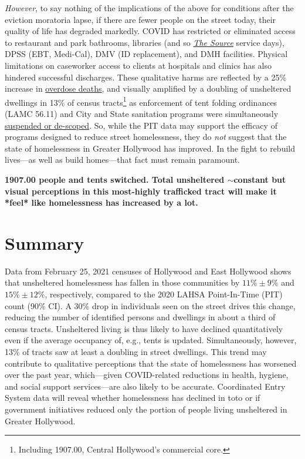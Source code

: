 \documentclass[11pt,twocolumn]{article}
\def\bfr{\bf\color{red}}
\def\resp{respectively}
\begin{document}
{\it However}, to say nothing of the implications of the above for conditions after the eviction moratoria
lapse, if there are fewer people on the street today, their quality of life has degraded markedly. COVID has restricted or 
eliminated access to restaurant and park bathrooms, libraries (and so 
\href{https://www.lapl.org/homeless-resources/the-source}{\it The Source} service days), DPSS 
(EBT, Medi-Cal), DMV (ID replacement), and DMH facilities. Physical limitations on caseworker 
access to clients at hospitals and clinics has also hindered successful discharges. These qualitative harms are reflected 
by a 25\% increase in 
\href{https://www.latimes.com/california/story/2021-01-07/the-powerful-synthetic-opioid-fentanyl-is-behind-rising-deaths-in-the-homeless-population}{overdose deaths}, and visually amplified by a doubling of unsheltered dwellings in 13\% of census 
tracts\footnote{Including 1907.00, Central Hollywood's commercial core.} as enforcement of tent folding ordinances
(LAMC 56.11) and City and State sanitation programs were simultaneously 
\href{https://clkrep.lacity.org/onlinedocs/2020/20-0147_misc_3-17-20_p.pdf}{suspended or de-scoped}. 
So, while the PIT data may support the efficacy of programs designed to reduce street 
homelessness, they do {\it not} suggest that the state of homelessness in Greater Hollywood has improved. In the 
fight to rebuild lives---as well as build homes---that fact must remain paramount.


{\bfr 1907.00 people and tents switched. Total unsheltered $\sim$constant but visual perceptions
in this most-highly trafficked tract will make it *feel* like homelessness has increased by a lot.}



\section{Summary}
\label{sec:summary}

Data from February 25, 2021 censuses of Hollywood and East Hollywood shows that 
unsheltered homelessness has fallen in those communities by $11\%\pm9\%$ and 
$15\%\pm12\%$, \resp, compared to the 2020 LAHSA Point-In-Time (PIT) count (90\% CI). 
A 30\% drop in individuals seen on the street drives this change, reducing the number of identified 
persons and dwellings in about a third of census tracts. Unsheltered living is thus likely to have 
declined quantitatively even if the average occupancy of, e.g., tents is updated. Simultaneously, 
however, 13\% of tracts saw at least a doubling in street dwellings. This trend may contribute to 
qualitative perceptions that the state of homelessness has worsened over the past year, which---given 
COVID-related reductions in health, hygiene, and social support services---are also likely to be accurate.
Coordinated Entry System data will reveal whether homelessness has declined in toto or if 
government initiatives reduced only the portion of people living unsheltered in Greater Hollywood.
\end{document}
